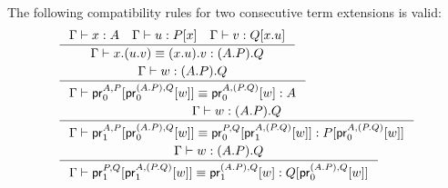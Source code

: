 \begin{lem}
The following compatibility rules for two consecutive term extensions is valid:
\begin{align*}
& \inference
  {\jterm{\Gamma}{A}{x}
   \jterm{\Gamma}{\subst{x}{P}}{u}
   \jterm{\Gamma}{\subst{\tmext{A}{P}{x}{u}}{Q}}{v}}
  {\jtermeq{\Gamma}{\ctxext{{A}{P}}{Q}}{\tmext{A}{{P}{Q}}{x}{{u}{v}}}{\tmext{{A}{P}}{Q}{{x}{u}}{v}}}\\
& \inference
  {\jterm{\Gamma}{\ctxext{{A}{P}}{Q}}{w}}
  {\jtermeq{\Gamma}{A}{\cprojfst{A}{P}{\cprojfst{\ctxext{A}{P}}{Q}{w}}}{\cprojfst{A}{\ctxext{P}{Q}}{w}}}\\
& \inference
  {\jterm{\Gamma}{\ctxext{{A}{P}}{Q}}{w}}
  {\jtermeq{\Gamma}{\subst{\cprojfst{A}{\ctxext{P}{Q}}{w}}{P}}
    {\cprojsnd{A}{P}{\cprojfst{\ctxext{A}{P}}{Q}{w}}}
    {\cprojfst{P}{Q}{\cprojsnd{A}{\ctxext{P}{Q}}{w}}}}\\
& \inference
  {\jterm{\Gamma}{\ctxext{{A}{P}}{Q}}{w}}
  {\jtermeq{\Gamma}{\subst{\cprojfst{\ctxext{A}{P}}{Q}{w}}{Q}}
    {\cprojsnd{P}{Q}{\cprojsnd{A}{\ctxext{P}{Q}}{w}}}
    {\cprojsnd{\ctxext{A}{P}}{Q}{w}}}
\end{align*}
\end{lem}

